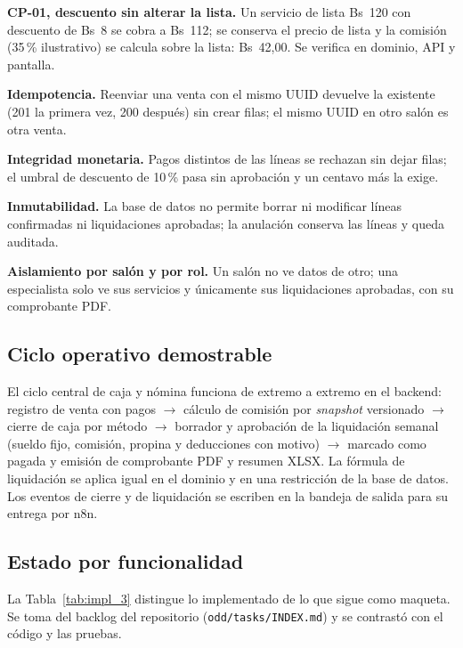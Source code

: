 \begin{vinetas}
\item \textbf{CP-01, descuento sin alterar la lista.} Un servicio de lista Bs~120 con descuento de Bs~8 se cobra a Bs~112; se conserva el precio de lista y la comisión (35\,\% ilustrativo) se calcula sobre la lista: Bs~42,00. Se verifica en dominio, API y pantalla.
\item \textbf{Idempotencia.} Reenviar una venta con el mismo UUID devuelve la existente (201 la primera vez, 200 después) sin crear filas; el mismo UUID en otro salón es otra venta.
\item \textbf{Integridad monetaria.} Pagos distintos de las líneas se rechazan sin dejar filas; el umbral de descuento de 10\,\% pasa sin aprobación y un centavo más la exige.
\item \textbf{Inmutabilidad.} La base de datos no permite borrar ni modificar líneas confirmadas ni liquidaciones aprobadas; la anulación conserva las líneas y queda auditada.
\item \textbf{Aislamiento por salón y por rol.} Un salón no ve datos de otro; una especialista solo ve sus servicios y únicamente sus liquidaciones aprobadas, con su comprobante PDF.
\end{vinetas}

\subsection{Ciclo operativo demostrable}

El ciclo central de caja y nómina funciona de extremo a extremo en el backend: registro de venta con pagos $\rightarrow$ cálculo de comisión por \textit{snapshot} versionado $\rightarrow$ cierre de caja por método $\rightarrow$ borrador y aprobación de la liquidación semanal (sueldo fijo, comisión, propina y deducciones con motivo) $\rightarrow$ marcado como pagada y emisión de comprobante PDF y resumen XLSX. La fórmula de liquidación se aplica igual en el dominio y en una restricción de la base de datos. Los eventos de cierre y de liquidación se escriben en la bandeja de salida para su entrega por n8n.

\subsection{Estado por funcionalidad}

La Tabla~\ref{tab:impl_3} distingue lo implementado de lo que sigue como maqueta. Se toma del backlog del repositorio (\texttt{odd/tasks/INDEX.md}) y se contrastó con el código y las pruebas.


